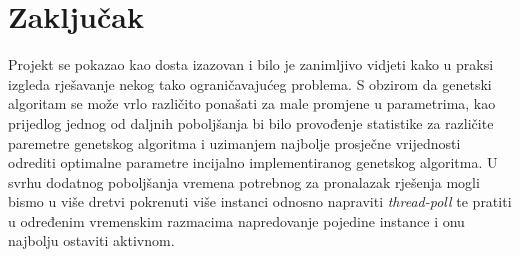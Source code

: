 \documentclass[11pt]{article}
\begin{document}
\section{Zaključak}
Projekt se pokazao kao dosta izazovan i bilo je zanimljivo vidjeti kako u praksi izgleda rješavanje nekog tako ograničavajućeg problema. S obzirom da genetski algoritam se može vrlo različito ponašati za male promjene u parametrima, kao prijedlog jednog od daljnih poboljšanja bi bilo provođenje statistike za različite paremetre genetskog algoritma i uzimanjem najbolje prosječne vrijednosti odrediti optimalne parametre incijalno implementiranog genetskog algoritma. U svrhu dodatnog poboljšanja vremena potrebnog za pronalazak rješenja mogli bismo u više dretvi pokrenuti više instanci odnosno napraviti \textit{thread-poll} te pratiti u određenim vremenskim razmacima napredovanje pojedine instance i onu najbolju ostaviti aktivnom.

\end{document}
